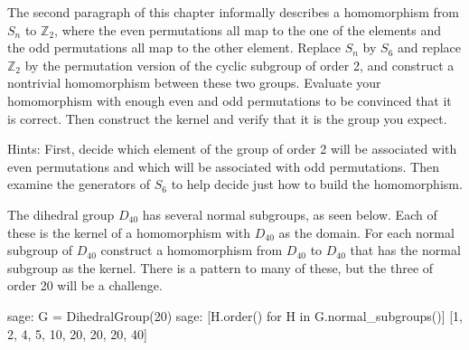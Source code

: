 \begin{sageverbatim}\end{sageverbatim}
%
%
The second paragraph of this chapter informally describes a homomorphism from $S_n$ to ${\mathbb Z}_2$, where the even permutations all map to the one of the elements and the odd permutations all map to the other element.  Replace $S_n$ by $S_6$ and replace ${\mathbb Z}_2$ by the permutation version of the cyclic subgroup of order 2, and construct a nontrivial homomorphism between these two groups.  Evaluate your homomorphism with enough even and odd permutations to be convinced that it is correct.  Then construct the kernel and verify that it is the group you expect.\par
%
Hints:  First, decide which element of the group of order 2 will be associated with even permutations and which will be associated with odd permutations.  Then examine the generators of $S_6$ to help decide just how to build the homomorphism.
\begin{sageverbatim}\end{sageverbatim}
%
%
The dihedral group $D_{40}$ has several normal subgroups, as seen below.  Each of these is the kernel of a homomorphism with $D_{40}$ as the domain.  For each normal subgroup of $D_{40}$ construct a homomorphism from $D_{40}$ to $D_{40}$ that has the normal subgroup as the kernel.  There is a pattern to many of these, but the three of order 20 will be a challenge.
%
\begin{sageexample}
sage: G = DihedralGroup(20)
sage: [H.order() for H in G.normal_subgroups()]
[1, 2, 4, 5, 10, 20, 20, 20, 40]
\end{sageexample}
%
%
\begin{sageverbatim}\end{sageverbatim}
